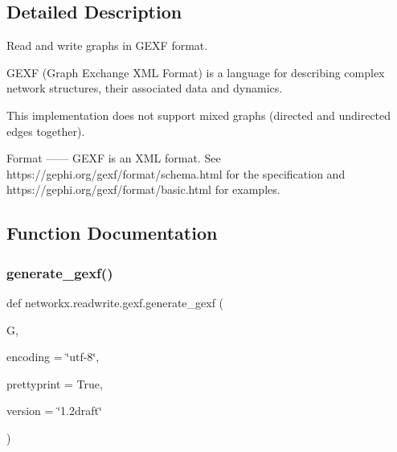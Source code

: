 \subsection{Detailed Description}
\begin{DoxyVerb}Read and write graphs in GEXF format.

GEXF (Graph Exchange XML Format) is a language for describing complex
network structures, their associated data and dynamics.

This implementation does not support mixed graphs (directed and
undirected edges together).

Format
------
GEXF is an XML format.  See https://gephi.org/gexf/format/schema.html for the
specification and https://gephi.org/gexf/format/basic.html for examples.
\end{DoxyVerb}
 

\subsection{Function Documentation}
\mbox{\label{namespacenetworkx_1_1readwrite_1_1gexf_adf0ef4d660c0029b6018d7405bd00bf8}} 
\subsubsection{\texorpdfstring{generate\+\_\+gexf()}{generate\_gexf()}}
{\footnotesize\ttfamily def networkx.\+readwrite.\+gexf.\+generate\+\_\+gexf (\begin{DoxyParamCaption}\item[{}]{G,  }\item[{}]{encoding = {\ttfamily \char`\"{}utf-\/8\char`\"{}},  }\item[{}]{prettyprint = {\ttfamily True},  }\item[{}]{version = {\ttfamily \char`\"{}1.2draft\char`\"{}} }\end{DoxyParamCaption})}

